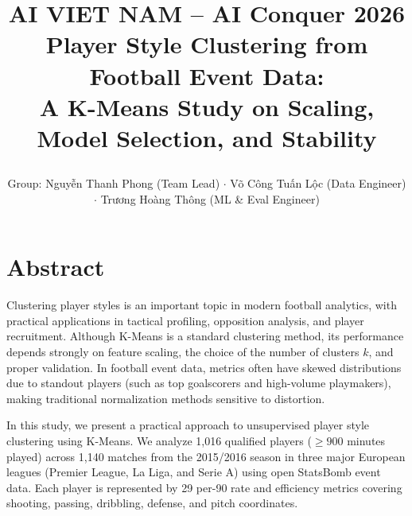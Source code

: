 \documentclass[12pt]{ai_conquer2026}
\title{%
  \begin{center}
        \Large {AI VIET NAM -- AI Conquer 2026}\\[.5ex]
        \Huge \textbf{Player Style Clustering from Football Event Data:\\[.3ex]
        A K-Means Study on Scaling, Model Selection, and Stability}\\[.5ex]
  \end{center}
}
\author{
\begin{minipage}{\textwidth}
\centering
{
\vspace{-1.5em}
Group: Nguyễn Thanh Phong (Team Lead) $\cdot$ Võ Công Tuấn Lộc (Data Engineer) $\cdot$ Trương Hoàng Thông (ML \& Eval Engineer)
}\\
\end{minipage}
}
\date{}
\begin{document}
\renewcommand{\contentsname}{Table of Contents}
\renewcommand{\refname}{References}
\renewcommand{\figurename}{Figure}
\renewcommand{\tablename}{Table}
\renewcommand{\capfig}[1]{%
  \refstepcounter{hinh}%
    Figure~\thehinh:~#1
}
\renewcommand{\appendixtocname}{Appendices}
\renewcommand{\appendixpagename}{Appendices}

\maketitle
\vspace{-5.5em}

\section{Abstract}

Clustering player styles is an important topic in modern football analytics, with practical applications in tactical profiling, opposition analysis, and player recruitment. Although K-Means is a standard clustering method, its performance depends strongly on feature scaling, the choice of the number of clusters $k$, and proper validation. In football event data, metrics often have skewed distributions due to standout players (such as top goalscorers and high-volume playmakers), making traditional normalization methods sensitive to distortion.

In this study, we present a practical approach to unsupervised player style clustering using K-Means. We analyze 1,016 qualified players ($\ge 900$ minutes played) across 1,140 matches from the 2015/2016 season in three major European leagues (Premier League, La Liga, and Serie A) using open StatsBomb event data. Each player is represented by 29 per-90 rate and efficiency metrics covering shooting, passing, dribbling, defense, and pitch coordinates.
\end{document}
